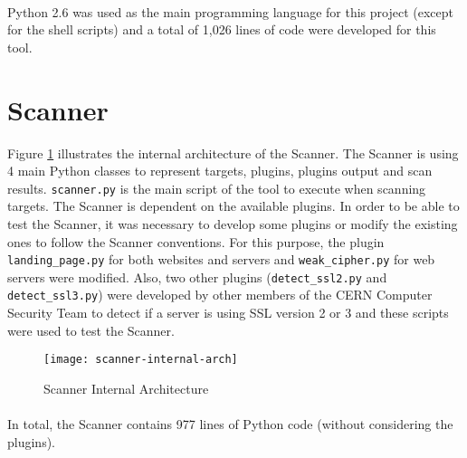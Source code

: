 \paragraph{}
Python 2.6 was used as the main programming language for this project (except for the shell scripts) and a total of 1,026 lines of code were developed for this tool. 
\section{Scanner}
Figure \ref{figure:scanner-internal-arch} illustrates the internal architecture of the Scanner. The Scanner is using 4 main Python classes to represent targets, plugins, plugins output and scan results. \texttt{scanner.py} is the main script of the tool to execute when scanning targets. The Scanner is dependent on the available plugins. In order to be able to test the Scanner, it was necessary to develop some plugins or modify the existing ones to follow the Scanner conventions. For this purpose, the plugin \texttt{landing\_page.py} for both websites and servers and \texttt{weak\_cipher.py} for web servers were modified. Also, two other plugins (\texttt{detect\_ssl2.py} and \texttt{detect\_ssl3.py}) were developed by other members of the CERN Computer Security Team to detect if a server is using SSL version 2 or 3 and these scripts were used to test the Scanner.
\begin{figure}[h!]
  \centering
    \texttt{[image: scanner-internal-arch]}
  \caption{Scanner Internal Architecture}
   \label{figure:scanner-internal-arch}
\end{figure}
\paragraph{}
In total, the Scanner contains 977 lines of Python code (without considering the plugins). 
